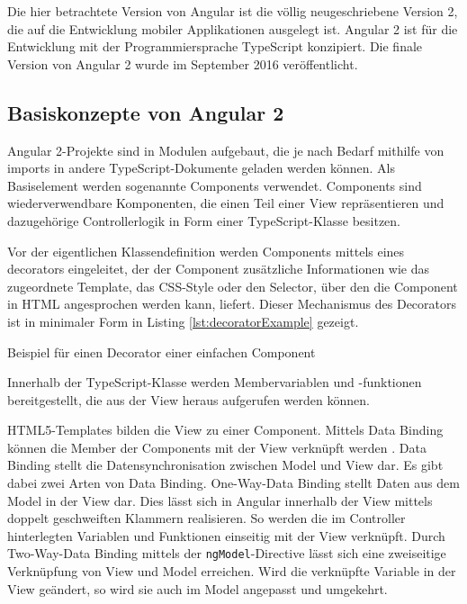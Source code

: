 Die hier betrachtete Version von Angular ist die völlig neugeschriebene Version 2, die auf die Entwicklung mobiler Applikationen ausgelegt ist. Angular 2 ist für die Entwicklung mit der Programmiersprache TypeScript konzipiert. Die finale Version von Angular 2 wurde im September 2016 veröffentlicht.
%
\subsection{Basiskonzepte von Angular 2}
Angular 2-Projekte sind in Modulen aufgebaut, die je nach Bedarf mithilfe von imports in andere TypeScript-Dokumente geladen werden können. Als Basiselement werden sogenannte Components verwendet. Components sind wiederverwendbare Komponenten, die einen Teil einer View repräsentieren und dazugehörige Controllerlogik in Form einer TypeScript-Klasse besitzen.

Vor der eigentlichen Klassendefinition werden Components mittels eines decorators eingeleitet, der der Component zusätzliche Informationen wie das zugeordnete Template, das CSS-Style oder den Selector, über den die Component in HTML angesprochen werden kann, liefert. Dieser Mechanismus des Decorators ist in minimaler Form in Listing \ref{lst:decoratorExample} gezeigt.

\begin{listing}[htb]
    
    \caption{Beispiel für einen Decorator einer einfachen Component}
    \label{lst:decoratorExample}
\end{listing}

Innerhalb der TypeScript-Klasse werden Membervariablen und -funktionen bereitgestellt, die aus der View heraus aufgerufen werden können.

HTML5-Templates bilden die View zu einer Component. Mittels Data Binding können die Member der Components mit der View verknüpft werden \cite{LynchAngularComponents}. Data Binding stellt die Datensynchronisation zwischen Model und View dar. Es gibt dabei zwei Arten von Data Binding. One-Way-Data Binding stellt Daten aus dem Model in der View dar. Dies lässt sich in Angular innerhalb der View mittels doppelt geschweiften Klammern realisieren. So werden die im Controller hinterlegten Variablen und Funktionen einseitig mit der View verknüpft. Durch Two-Way-Data Binding mittels der \texttt{ngModel}-Directive lässt sich eine zweiseitige Verknüpfung von View und Model erreichen. Wird die verknüpfte Variable in der View geändert, so wird sie auch im Model angepasst und umgekehrt.

